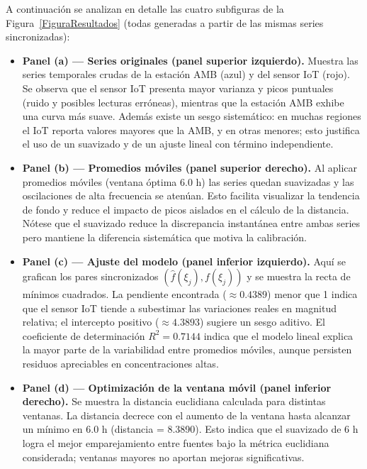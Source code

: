 \documentclass[spanish,notitlepage,letterpaper,11pt]{article} %
\begin{document}
A continuación se analizan en detalle las cuatro subfiguras de la Figura~\ref{FiguraResultados} (todas generadas a partir de las mismas series sincronizadas):

\begin{itemize}
  \item \textbf{Panel (a) — Series originales (panel superior izquierdo).} Muestra las series temporales crudas de la estación AMB (azul) y del sensor IoT (rojo). Se observa que el sensor IoT presenta mayor varianza y picos puntuales (ruido y posibles lecturas erróneas), mientras que la estación AMB exhibe una curva más suave. Además existe un sesgo sistemático: en muchas regiones el IoT reporta valores mayores que la AMB, y en otras menores; esto justifica el uso de un suavizado y de un ajuste lineal con término independiente.

  \item \textbf{Panel (b) — Promedios móviles (panel superior derecho).} Al aplicar promedios móviles (ventana óptima 6.0 h) las series quedan suavizadas y las oscilaciones de alta frecuencia se atenúan. Esto facilita visualizar la tendencia de fondo y reduce el impacto de picos aislados en el cálculo de la distancia. Nótese que el suavizado reduce la discrepancia instantánea entre ambas series pero mantiene la diferencia sistemática que motiva la calibración.

  \item \textbf{Panel (c) — Ajuste del modelo (panel inferior izquierdo).} Aquí se grafican los pares sincronizados $(\hat f(\xi_j),f(\xi_j))$ y se muestra la recta de mínimos cuadrados. La pendiente encontrada ($\approx0.4389$) menor que 1 indica que el sensor IoT tiende a subestimar las variaciones reales en magnitud relativa; el intercepto positivo ($\approx4.3893$) sugiere un sesgo aditivo. El coeficiente de determinación $R^2=0.7144$ indica que el modelo lineal explica la mayor parte de la variabilidad entre promedios móviles, aunque persisten residuos apreciables en concentraciones altas.

  \item \textbf{Panel (d) — Optimización de la ventana móvil (panel inferior derecho).} Se muestra la distancia euclidiana calculada para distintas ventanas. La distancia decrece con el aumento de la ventana hasta alcanzar un mínimo en 6.0 h (distancia = 8.3890). Esto indica que el suavizado de 6 h logra el mejor emparejamiento entre fuentes bajo la métrica euclidiana considerada; ventanas mayores no aportan mejoras significativas.
\end{itemize}
\end{document}
